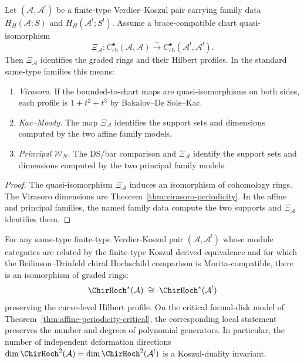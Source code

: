 \begin{proposition}
\label{prop:periodicity-same-type}
Let $(\mathcal A,\mathcal A^!)$ be a finite-type Verdier--Koszul pair
carrying family data $H_H(\mathcal A;S)$ and
$H_H(\mathcal A^!;S^!)$.  Assume a brace-compatible chart
quasi-isomorphism
\[
 \Xi_{\mathcal A}\colon
 C^\bullet_{\mathrm{ch}}(\mathcal A,\mathcal A)
 \xrightarrow{\ \sim\ }
 C^\bullet_{\mathrm{ch}}(\mathcal A^!,\mathcal A^!).
\]
Then $\Xi_{\mathcal A}$ identifies the graded rings and their Hilbert
profiles.  In the standard same-type families this means:
\begin{enumerate}[label=\textup{(\roman*)}]
\item \emph{Virasoro.}  If the bounded-to-chart maps are
quasi-isomorphisms on both sides, each profile is $1+t^2+t^3$ by
Bakalov--De Sole--Kac.
\item \emph{Kac--Moody.}  The map $\Xi_{\mathcal A}$ identifies the
support sets and dimensions computed by the two affine family models.
\item \emph{Principal $\mathcal W_N$.}  The DS/bar comparison and
$\Xi_{\mathcal A}$ identify the support sets and dimensions computed
by the two principal family models.
\end{enumerate}
\end{proposition}

\begin{proof}
The quasi-isomorphism $\Xi_{\mathcal A}$ induces an isomorphism of
cohomology rings.  The Virasoro dimensions are
Theorem~\ref{thm:virasoro-periodicity}.  In the affine and principal
families, the named family data compute the two supports and
$\Xi_{\mathcal A}$ identifies them.
\end{proof}

\begin{corollary}
\label{cor:hochschild-ring-koszul}
For any same-type finite-type Verdier-Koszul pair
$(\mathcal{A}, \mathcal{A}^!)$ whose module categories are related by
the finite-type Koszul derived equivalence and for which the
Beilinson--Drinfeld chiral Hochschild comparison is Morita-compatible,
there is
an isomorphism of graded rings:
\begin{equation}\label{eq:ch-koszul-iso}
\ChirHoch^*(\mathcal{A}) \;\cong\; \ChirHoch^*(\mathcal{A}^!)
\end{equation}
preserving the curve-level Hilbert profile.  On the critical
formal-disk model of Theorem~\textup{\ref{thm:affine-periodicity-critical}},
the corresponding local statement preserves the number and degrees of
polynomial generators.
In particular, the number of independent deformation directions
$\dim \ChirHoch^2(\mathcal{A})
 = \dim \ChirHoch^2(\mathcal{A}^!)$
is a Koszul-duality invariant.
\end{corollary}

